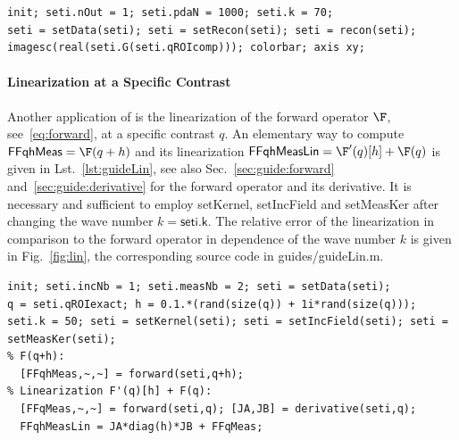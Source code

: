 \documentclass[a4paper]{article}
\begin{document}
\begin{lstlisting}[caption={Born approximation of the inverse medium problem (\emph{source code}: \textsf{guides/guideBornInv.m}).},label=lst:guideBornInv]
init; seti.nOut = 1; seti.pdaN = 1000; seti.k = 70; 
seti = setData(seti); seti = setRecon(seti); seti = recon(seti); 
imagesc(real(seti.G(seti.qROIcomp))); colorbar; axis xy;
\end{lstlisting}

%

\paragraph{Linearization at a Specific Contrast}
%
Another application of \IPscatt is the linearization of the forward operator $\F$, see~\eqref{eq:forward}, at a specific contrast $q$. An elementary way to compute $\textsf{FFqhMeas} = \F(q+h)$ and its linearization $\textsf{FFqhMeasLin} = \F'(q)[h]+\F(q)$ is given in Lst.~\ref{lst:guideLin}, see also Sec.~\ref{sec:guide:forward} and~\ref{sec:guide:derivative} for the forward operator and its derivative. It is necessary and sufficient to employ \textsf{setKernel}, \textsf{setIncField} and \textsf{setMeasKer} after changing the wave number $k = \textsf{seti.k}$. The relative error of the linearization in comparison to the forward operator in dependence of the wave number $k$ is given in Fig.~\ref{fig:lin}, the corresponding source code in \textsf{guides/\allowbreak guideLin.m}.

\begin{lstlisting}[caption={Linearization at a specific contrast (\emph{source code}: \textsf{guides/guideLin.m}).},label=lst:guideLin]
init; seti.incNb = 1; seti.measNb = 2; seti = setData(seti);
q = seti.qROIexact; h = 0.1.*(rand(size(q)) + 1i*rand(size(q)));
seti.k = 50; seti = setKernel(seti); seti = setIncField(seti); seti = setMeasKer(seti);
% F(q+h):
  [FFqhMeas,~,~] = forward(seti,q+h);
% Linearization F'(q)[h] + F(q):
  [FFqMeas,~,~] = forward(seti,q); [JA,JB] = derivative(seti,q);
  FFqhMeasLin = JA*diag(h)*JB + FFqMeas; 
\end{lstlisting}

%
\end{document}
